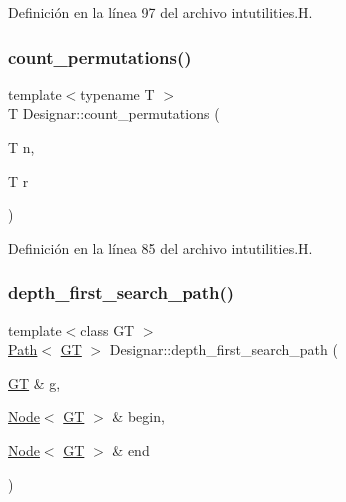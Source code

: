Definición en la línea 97 del archivo intutilities.\+H.

\mbox{\label{namespace_designar_a9de2f2da31210c49529db21c84162576}} 
\subsubsection{\texorpdfstring{count\+\_\+permutations()}{count\_permutations()}}
{\footnotesize\ttfamily template$<$typename T $>$ \\
T Designar\+::count\+\_\+permutations (\begin{DoxyParamCaption}\item[{T}]{n,  }\item[{T}]{r }\end{DoxyParamCaption})}



Definición en la línea 85 del archivo intutilities.\+H.

\mbox{\label{namespace_designar_ab5b060dde0b717e9818c796da60b39b1}} 
\subsubsection{\texorpdfstring{depth\+\_\+first\+\_\+search\+\_\+path()}{depth\_first\_search\_path()}}
{\footnotesize\ttfamily template$<$class GT $>$ \\
\hyperlink{class_designar_1_1_path}{Path}$<$ \hyperlink{demo-buildgraph_8_c_a3001c40d2c31ca87ed96cd7d1334a55e}{GT} $>$ Designar\+::depth\+\_\+first\+\_\+search\+\_\+path (\begin{DoxyParamCaption}\item[{\hyperlink{demo-buildgraph_8_c_a3001c40d2c31ca87ed96cd7d1334a55e}{GT} \&}]{g,  }\item[{\hyperlink{namespace_designar_a5af326c65aa2bd26b26c410f2030d09e}{Node}$<$ \hyperlink{demo-buildgraph_8_c_a3001c40d2c31ca87ed96cd7d1334a55e}{GT} $>$ \&}]{begin,  }\item[{\hyperlink{namespace_designar_a5af326c65aa2bd26b26c410f2030d09e}{Node}$<$ \hyperlink{demo-buildgraph_8_c_a3001c40d2c31ca87ed96cd7d1334a55e}{GT} $>$ \&}]{end }\end{DoxyParamCaption})}



